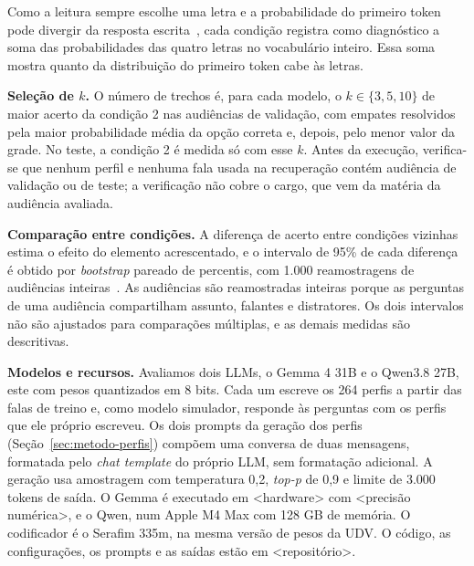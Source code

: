Como a leitura sempre escolhe uma letra e a probabilidade do primeiro token pode divergir da
resposta escrita~\citep{wang2024answer}, cada condição registra como diagnóstico a soma das
probabilidades das quatro letras no vocabulário inteiro. Essa soma mostra quanto da distribuição do
primeiro token cabe às letras.

\textbf{Seleção de $k$.} O número de trechos é, para cada modelo, o $k \in \{3, 5, 10\}$ de maior
acerto da condição 2 nas audiências de validação, com empates resolvidos pela maior probabilidade média da opção correta
e, depois, pelo menor valor da grade. No teste, a condição 2 é medida só com esse $k$. Antes da
execução, verifica-se que nenhum perfil e nenhuma fala usada na recuperação contém audiência de
validação ou de teste; a verificação não cobre o cargo, que vem da matéria da audiência avaliada.

\textbf{Comparação entre condições.} A diferença de acerto entre condições vizinhas estima o efeito
do elemento acrescentado, e o intervalo de 95\% de cada diferença é obtido por \textit{bootstrap}
pareado de percentis, com 1.000 reamostragens de audiências inteiras~\citep{efron1993introduction}.
As audiências são reamostradas inteiras porque as perguntas de uma audiência compartilham assunto,
falantes e distratores. Os dois intervalos não são ajustados para comparações múltiplas, e as demais
medidas são descritivas.

\textbf{Modelos e recursos.} Avaliamos dois LLMs, o Gemma 4 31B e o Qwen3.8 27B, este com pesos
quantizados em 8 bits. Cada um escreve os 264 perfis a partir das falas de treino e, como modelo simulador, responde às
perguntas com os perfis que ele próprio escreveu. Os dois prompts da geração dos perfis
(Seção~\ref{sec:metodo-perfis}) compõem uma conversa de duas mensagens, formatada pelo \textit{chat
template} do próprio LLM, sem formatação adicional. A geração usa amostragem com temperatura 0,2,
\textit{top-p} de 0,9 e limite de 3.000 tokens de saída. O Gemma é executado em <hardware> com
<precisão numérica>, e o Qwen, num Apple M4 Max com 128 GB de memória. O codificador é o Serafim
335m, na mesma versão de pesos da UDV. O código, as configurações, os prompts e as saídas estão em
<repositório>.
